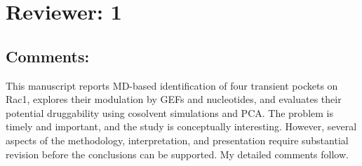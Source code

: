 \documentclass[11pt, a4paper]{article}
\begin{document}
\section{Reviewer: 1}

\subsection{Comments:}
This manuscript reports MD-based identification of four transient pockets on Rac1, explores their modulation by GEFs and nucleotides, and evaluates their potential druggability using cosolvent simulations and PCA. The problem is timely and important, and the study is conceptually interesting. However, several aspects of the methodology, interpretation, and presentation require substantial revision before the conclusions can be supported. My detailed comments follow.
\end{document}
